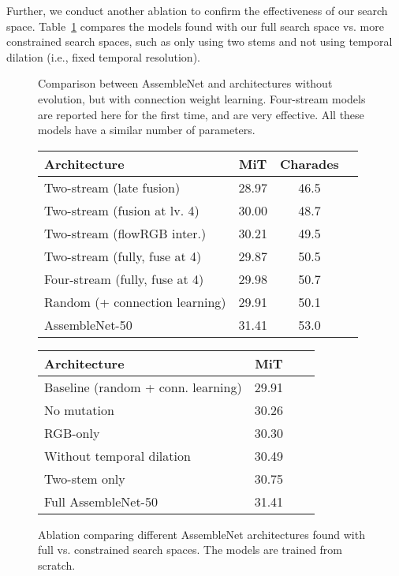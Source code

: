 \documentclass{article} \usepackage{iclr2020_conference,times}
\begin{document}
Further, we conduct another ablation to confirm the effectiveness of our search space. Table~\ref{tab:ablation2} compares the models found with our full search space vs. more constrained search spaces, such as only using two stems and not using temporal dilation (i.e., fixed temporal resolution).





\begin{figure}
\begin{minipage}{0.5\textwidth}
    \centering
    \captionsetup{type=table}
    \setlength\tabcolsep{2pt}
    \caption{Comparison between AssembleNet and architectures without evolution, but with connection weight learning. Four-stream models are reported here for the first time, and are very effective. All these models have a similar number of parameters.}
    \label{tab:ablation}
    \begin{tabular}{lccc}
    \toprule
       Architecture & MiT & Charades\\
    \midrule
    Two-stream (late fusion)  & 28.97 & 46.5\\
    Two-stream (fusion at lv. 4) & 30.00 & 48.7\\
    Two-stream (flowRGB inter.) & 30.21 & 49.5\\
    Two-stream (fully, fuse at 4) & 29.87 & 50.5\\
Four-stream (fully, fuse at 4) & 29.98 & 50.7\\
    \hline
    Random (+ connection learning) & 29.91 & 50.1\\
    \hline
    AssembleNet-50 & 31.41 & 53.0\\
    \bottomrule
    \end{tabular}
\end{minipage}
\hspace{0.02\textwidth}
\begin{minipage}{0.47\textwidth}
    \centering
    \captionsetup{type=table}
    \setlength\tabcolsep{3pt}
    \caption{Ablation comparing different AssembleNet architectures found with full vs. constrained search spaces. The models are trained from scratch.}
    \label{tab:ablation2}
    \begin{tabular}{lccc}
    \toprule
       Architecture & MiT\\
    \midrule
    Baseline (random + conn. learning) & 29.91\\
    \hline
    No mutation & 30.26\\
    RGB-only & 30.30\\
    Without temporal dilation & 30.49\\
    Two-stem only & 30.75\\
    \hline
    Full AssembleNet-50 & 31.41\\
    \bottomrule
    \end{tabular}
\end{minipage}
\end{figure}
\end{document}
